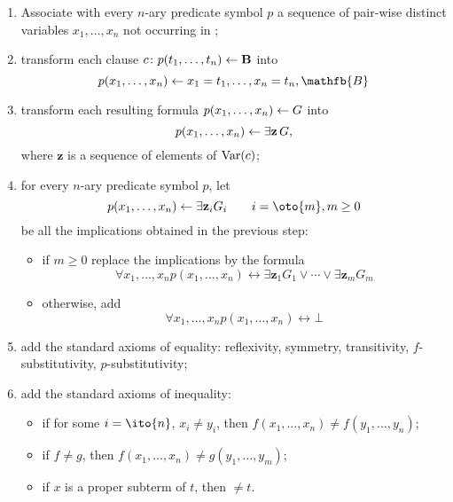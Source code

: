 \begin{enumerate}
    \item Associate with every \(n\)-ary predicate symbol \(p\) a sequence of pair-wise distinct variables \(x_1,\dotsc,x_n\) not occurring in \prog;
    \item transform each clause \(c \colon p(t_1,\dotsc,t_n) \leftarrow \mathbf{B}\) into
    \begin{equation*}
        p(x_1,\dotsc,x_n) \from
        x_1 = t_1,\dotsc,x_n = t_n, \mathfb{B}
    \end{equation*}
        \item transform each resulting formula \(p(x_1,\dotsc,x_n) \leftarrow G\) into
        \begin{equation*}
            p(x_1,\dotsc,x_n) \leftarrow \exists{\mathbf{z}}\,G,
        \end{equation*}
        where \(\mathbf{z}\) is a sequence of elements of \(\operatorname{Var}(c)\);
        \item for every \(n\)-ary predicate symbol \(p\), let
        \begin{equation*}
            p(x_1,\dotsc,x_n) \from \exists{\mathbf{z}_i} G_i \qquad i = \oto{m}, m \ge 0
        \end{equation*}
        be all the implications obtained in the previous step:
        \begin{itemize}
            \item if \(m \ge 0\) replace the implications by the formula
            \begin{equation*}
                \forall{x_1,\dotsc,x_n} p(x_1,\dotsc,x_n) \leftrightarrow \exists{\mathbf{z}_1} G_1 \lor \dotsb \lor \exists{\mathbf{z}_m} G_m
            \end{equation*}
            \item otherwise, add
            \begin{equation*}
                \forall{x_1,\dotsc,x_n} p(x_1,\dotsc,x_n) \leftrightarrow \bot
            \end{equation*}
        \end{itemize}
        \item add the standard axioms of equality: reflexivity, symmetry, transitivity, \(f\)-substitutivity, \(p\)-substitutivity;
        \item add the standard axioms of inequality:
        \begin{itemize}
            \item if for some \(i = \ito{n}\), \(x_i \ne y_i\), then \(f(x_1,\dotsc,x_n) \ne f(y_1,\dotsc,y_n)\);
            \item if \(f \ne g\), then \(f(x_1,\dotsc,x_n) \ne g(y_1,\dotsc,y_m)\);
            \item if \(x\) is a proper subterm of \(t\), then \( \ne t\).
        \end{itemize}
    \end{enumerate}

